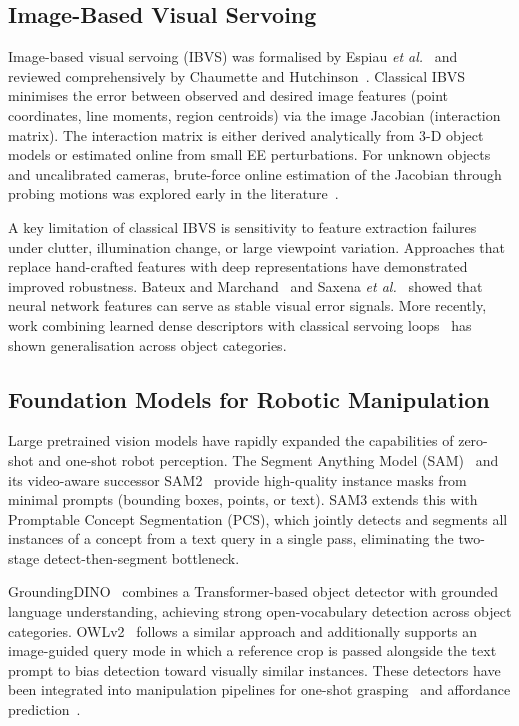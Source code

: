 \documentclass[lettersize,journal]{IEEEtran}
\begin{document}
\subsection{Image-Based Visual Servoing}

Image-based visual servoing (IBVS) was formalised by Espiau
\emph{et al.}~\cite{espiau1992new} and reviewed comprehensively by Chaumette
and Hutchinson~\cite{chaumette2006visual,chaumette2007visual}.  Classical
IBVS minimises the error between observed and desired image features
(point coordinates, line moments, region centroids) via the image Jacobian
(interaction matrix).  The interaction matrix is either derived analytically
from 3-D object models or estimated online from small EE perturbations.
For unknown objects and uncalibrated cameras, brute-force online estimation
of the Jacobian through probing motions was explored early in the
literature~\cite{piepmeier2004uncalibrated}.

A key limitation of classical IBVS is sensitivity to feature extraction
failures under clutter, illumination change, or large viewpoint variation.
Approaches that replace hand-crafted features with deep representations have
demonstrated improved robustness.  Bateux and
Marchand~\cite{bateux2017training} and Saxena \emph{et al.}~\cite{saxena2017neural}
showed that neural network features can serve as stable visual error
signals.  More recently, work combining learned dense descriptors with
classical servoing loops~\cite{lampe2023learning} has shown generalisation
across object categories.

\subsection{Foundation Models for Robotic Manipulation}

Large pretrained vision models have rapidly expanded the capabilities of
zero-shot and one-shot robot perception.  The Segment Anything Model
(SAM)~\cite{kirillov2023segment} and its video-aware successor
SAM2~\cite{ravi2024sam2} provide high-quality instance masks from minimal
prompts (bounding boxes, points, or text).  SAM3 extends this with
Promptable Concept Segmentation (PCS), which jointly detects and segments
all instances of a concept from a text query in a single pass, eliminating
the two-stage detect-then-segment bottleneck.

GroundingDINO~\cite{liu2023grounding} combines a Transformer-based object
detector with grounded language understanding, achieving strong
open-vocabulary detection across object categories.  OWLv2~\cite{minderer2023scaling}
follows a similar approach and additionally supports an image-guided query
mode in which a reference crop is passed alongside the text prompt to bias
detection toward visually similar instances.  These detectors have been
integrated into manipulation pipelines for one-shot grasping~\cite{liu2024graspgdino}
and affordance prediction~\cite{tang2023taskgrasp}.
\end{document}
